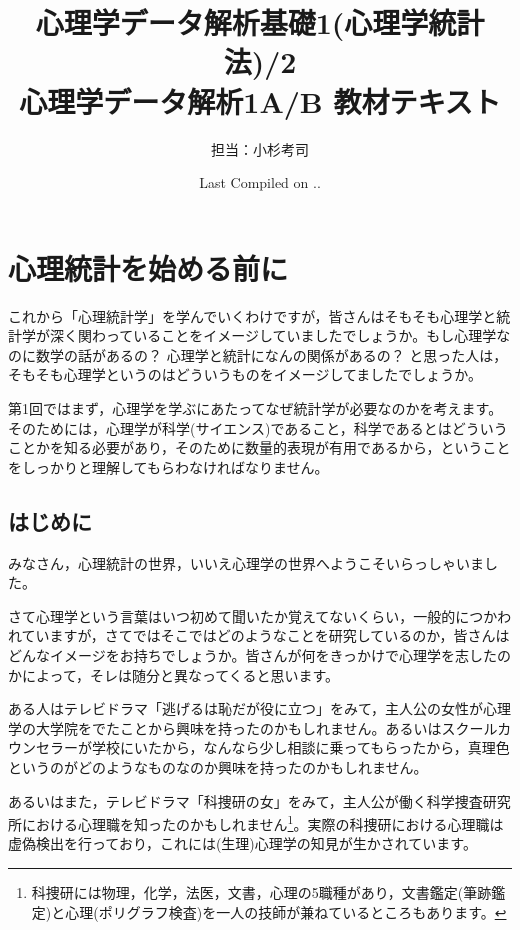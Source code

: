 \documentclass{book}
\begin{document}
\title{心理学データ解析基礎1(心理学統計法)/2\\心理学データ解析1A/B 教材テキスト}
\author{担当：小杉考司}
\date{Last Compiled on \number\year .\number\month .\number\day}
\maketitle
\setcounter{tocdepth}{1}
\tableofcontents
\chapter{心理統計を始める前に}
\label{chapter1}
これから「心理統計学」を学んでいくわけですが，皆さんはそもそも心理学と統計学が深く関わっていることをイメージしていましたでしょうか。もし心理学なのに数学の話があるの？ 心理学と統計になんの関係があるの？ と思った人は，そもそも心理学というのはどういうものをイメージしてましたでしょうか。

第1回ではまず，心理学を学ぶにあたってなぜ統計学が必要なのかを考えます。そのためには，心理学が科学(サイエンス)であること，科学であるとはどういうことかを知る必要があり，そのために数量的表現が有用であるから，ということをしっかりと理解してもらわなければなりません。

\section{はじめに}

みなさん，心理統計の世界，いいえ心理学の世界へようこそいらっしゃいました。

さて心理学という言葉はいつ初めて聞いたか覚えてないくらい，一般的につかわれていますが，さてではそこではどのようなことを研究しているのか，皆さんはどんなイメージをお持ちでしょうか。皆さんが何をきっかけで心理学を志したのかによって，そレは随分と異なってくると思います。

ある人はテレビドラマ「逃げるは恥だが役に立つ」をみて，主人公の女性が心理学の大学院をでたことから興味を持ったのかもしれません。あるいはスクールカウンセラーが学校にいたから，なんなら少し相談に乗ってもらったから，真理色というのがどのようなものなのか興味を持ったのかもしれません。

あるいはまた，テレビドラマ「科捜研の女」をみて，主人公が働く科学捜査研究所における心理職を知ったのかもしれません\footnote{科捜研には物理，化学，法医，文書，心理の5職種があり，文書鑑定(筆跡鑑定)と心理(ポリグラフ検査)を一人の技師が兼ねているところもあります。}。実際の科捜研における心理職は虚偽検出を行っており，これには(生理)心理学の知見が生かされています。
\end{document}

